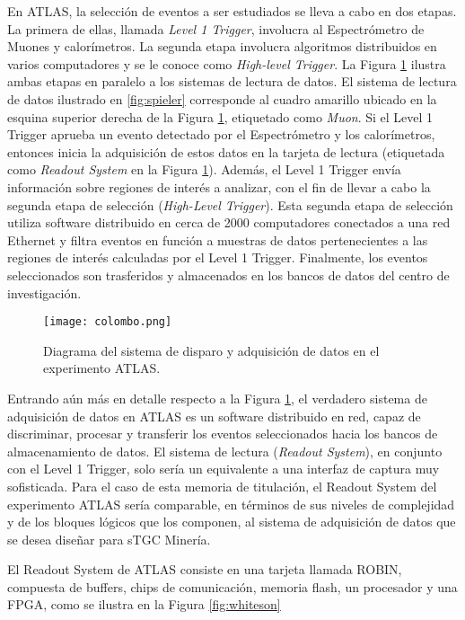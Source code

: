 	En ATLAS, la selección de eventos a ser estudiados se lleva a cabo en dos etapas. La primera de ellas, llamada \textit{Level 1 Trigger}, involucra al Espectrómetro de Muones y calorímetros. La segunda etapa involucra algoritmos distribuidos en varios computadores y se le conoce como \textit{High-level Trigger}. La Figura \ref{fig:colombo} ilustra ambas etapas en paralelo a los sistemas de lectura de datos. El sistema de lectura de datos ilustrado en \ref{fig:spieler} corresponde al cuadro amarillo ubicado en la esquina superior derecha de la Figura \ref{fig:colombo}, etiquetado como \textit{Muon}. Si el Level 1 Trigger aprueba un evento detectado por el Espectrómetro y los calorímetros, entonces inicia la adquisición de estos datos en la tarjeta de lectura (etiquetada como \textit{Readout System} en la Figura \ref{fig:colombo}). Además, el Level 1 Trigger envía información sobre regiones de interés a analizar, con el fin de llevar a cabo la segunda etapa de selección (\textit{High-Level Trigger}). Esta segunda etapa de selección utiliza software distribuido en cerca de 2000 computadores conectados a una red Ethernet y filtra eventos en función a muestras de datos pertenecientes a las regiones de interés calculadas por el Level 1 Trigger\cite{Colombo2015Data-flowCase}. Finalmente, los eventos seleccionados son trasferidos y  almacenados en los bancos de datos del centro de investigación.
	
	\begin{figure}[h]
		\centering
		\texttt{[image: colombo.png]}
		\caption{Diagrama del sistema de disparo y adquisición de datos en el experimento ATLAS. \cite{Colombo2015Data-flowCase}}
		\label{fig:colombo}
	\end{figure}
	
	Entrando aún más en detalle respecto a la Figura \ref{fig:colombo}, el verdadero sistema de adquisición de datos en ATLAS es un software distribuido en red\cite{Whiteson2016TheSystem}, capaz de discriminar, procesar y transferir los eventos seleccionados hacia los bancos de almacenamiento de datos. El sistema de lectura (\textit{Readout System}), en conjunto con el Level 1 Trigger, solo sería un equivalente a una interfaz de captura muy sofisticada. Para el caso de esta memoria de titulación, el Readout System del experimento ATLAS sería comparable, en términos de sus niveles de complejidad y de los bloques lógicos que los componen, al sistema de adquisición de datos que se desea diseñar para sTGC Minería.
	
	El Readout System de ATLAS consiste en una tarjeta llamada ROBIN, compuesta de buffers, chips de comunicación, memoria flash, un procesador y una FPGA, como se ilustra en la Figura \ref{fig:whiteson}
	

